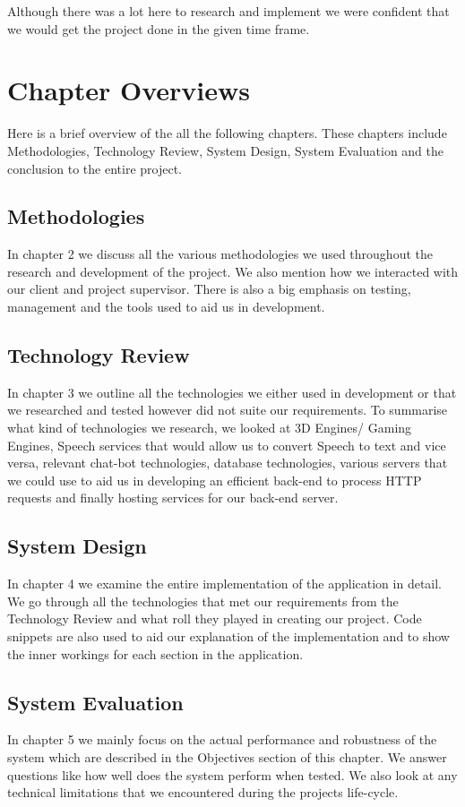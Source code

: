 Although there was a lot here to research and implement we were confident that we would get the project done in the given time frame.

\section{Chapter Overviews}
Here is a brief overview of the all the following chapters. These chapters include Methodologies, Technology Review, System Design, System Evaluation and the conclusion to the entire project.
\subsection{Methodologies}
In chapter 2 we discuss all the various methodologies we used throughout the research and development of the project. We also mention how we interacted with our client and project supervisor. There is also a big emphasis on testing, management and the tools used to aid us in development. 
\subsection{Technology Review}
In chapter 3 we outline all the technologies we either used in development or that we researched and tested however did not suite our requirements. To summarise what kind of technologies we research, we looked at 3D Engines/ Gaming Engines, Speech services that would allow us to convert Speech to text and vice versa, relevant chat-bot technologies, database technologies, various servers that we could use to aid us in developing an efficient back-end to process HTTP requests and finally hosting services for our back-end server. 
\subsection{System Design}
In chapter 4 we examine the entire implementation of the application in detail. We go through all the technologies that met our requirements from the Technology Review and what roll they played in creating our project. Code snippets are also used to aid our explanation of the implementation and to show the inner workings for each section in the application.
\subsection{System Evaluation}
In chapter 5 we mainly focus on the actual performance and robustness of the system which are described in the Objectives section of this chapter. We answer questions like how well does the system perform when tested. We also look at any technical limitations that we encountered during the projects life-cycle. 
